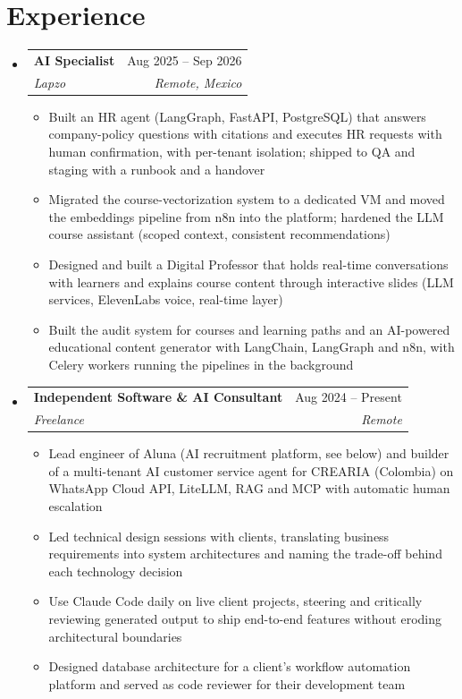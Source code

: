 \documentclass[letterpaper,10pt]{article}
\makeatletter
\newcommand{\resumeSubheading}[4]{
  \vspace{-2pt}
  \item[]
  \begin{tabular*}{\textwidth}{@{\extracolsep{\fill}}l r}
    \textbf{#1} & #2 \\
    \textit{#3} & \textit{#4} \\
  \end{tabular*}
  \vspace{-5pt}
}
\makeatother
\begin{document}
\section{Experience}
\begin{itemize}[leftmargin=0pt, itemindent=0pt, label={}, itemsep=1pt]
\resumeSubheading
{AI Specialist}{Aug 2025 -- Sep 2026}
{Lapzo}{Remote, Mexico}
\begin{itemize}[leftmargin=*, itemsep=0pt]
    \item Built an HR agent (LangGraph, FastAPI, PostgreSQL) that answers company-policy questions with citations and executes HR requests with human confirmation, with per-tenant isolation; shipped to QA and staging with a runbook and a handover
    \item Migrated the course-vectorization system to a dedicated VM and moved the embeddings pipeline from n8n into the platform; hardened the LLM course assistant (scoped context, consistent recommendations)
    \item Designed and built a Digital Professor that holds real-time conversations with learners and explains course content through interactive slides (LLM services, ElevenLabs voice, real-time layer)
    \item Built the audit system for courses and learning paths and an AI-powered educational content generator with LangChain, LangGraph and n8n, with Celery workers running the pipelines in the background
\end{itemize}
\resumeSubheading
{Independent Software \& AI Consultant}{Aug 2024 -- Present}
{Freelance}{Remote}
\begin{itemize}[leftmargin=*, itemsep=0pt]
    \item Lead engineer of Aluna (AI recruitment platform, see below) and builder of a multi-tenant AI customer service agent for CREARIA (Colombia) on WhatsApp Cloud API, LiteLLM, RAG and MCP with automatic human escalation
    \item Led technical design sessions with clients, translating business requirements into system architectures and naming the trade-off behind each technology decision
    \item Use Claude Code daily on live client projects, steering and critically reviewing generated output to ship end-to-end features without eroding architectural boundaries
    \item Designed database architecture for a client's workflow automation platform and served as code reviewer for their development team
\end{itemize}

\end{itemize}
\end{document}
